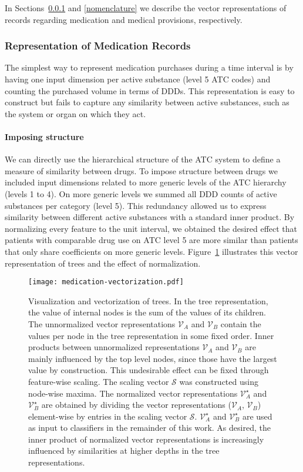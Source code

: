 In Sections~\ref{ATC-vectorization} and \ref{nomenclature} we describe the vector representations of records regarding medication and medical provisions, respectively.


\subsubsection{Representation of Medication Records} \label{ATC-vectorization}
The simplest way to represent medication purchases during a time interval is by having one input dimension per active substance (level 5 ATC codes) and counting the purchased volume in terms of DDDs. This representation is easy to construct but fails to capture any similarity between active substances, such as the system or organ on which they act.

\paragraph{Imposing structure}
We can directly use the hierarchical structure of the ATC system to define a measure of similarity between drugs. To impose structure between drugs we included input dimensions related to more generic levels of the ATC hierarchy (levels 1 to 4). On more generic levels we summed all DDD counts of active substances per category (level 5). This redundancy allowed us to express similarity between different active substances with a standard inner product. By normalizing every feature to the unit interval, we obtained the desired effect that patients with comparable drug use on ATC level 5 are more similar than patients that only share coefficients on more generic levels.
Figure~\ref{fig:medication-vectorization} illustrates this vector representation of trees and the effect of normalization.

\begin{figure}[!h]
  \centering
  \texttt{[image: medication-vectorization.pdf]}
  \caption{Visualization and vectorization of trees. In the tree representation, the value of internal nodes is the sum of the values of its children. The unnormalized vector representations $\mathcal{V}_A$ and $\mathcal{V}_B$ contain the values per node in the tree representation in some fixed order. Inner products between unnormalized representations $\mathcal{V}_A$ and $\mathcal{V}_B$ are mainly influenced by the top level nodes, since those have the largest value by construction. This undesirable effect can be fixed through feature-wise scaling. The scaling vector $\mathcal{S}$ was constructed using node-wise maxima. The normalized vector representations $\mathcal{V}_A^\star$ and $\mathcal{V}_B^\star$ are obtained by dividing the vector representations ($\mathcal{V}_A$, $\mathcal{V}_B$) element-wise by entries in the scaling vector $\mathcal{S}$. $\mathcal{V}_A^\star$ and $\mathcal{V}_B^\star$ are used as input to classifiers in the remainder of this work. As desired, the inner product of normalized vector representations is increasingly influenced by similarities at higher depths in the tree representations.} 
  \label{fig:medication-vectorization}
\end{figure}


